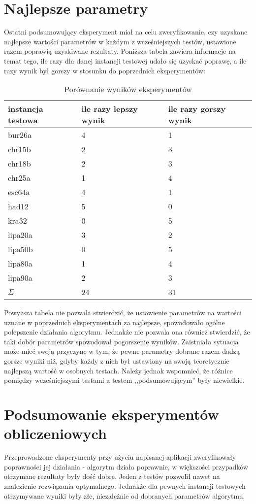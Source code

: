 \section{Najlepsze parametry}
Ostatni podsumowujący eksperyment miał na celu zweryfikowanie, czy uzyskane najlepsze wartości parametrów w każdym z wcześniejszych testów, ustawione razem poprawią uzyskiwane rezultaty. Poniższa tabela zawiera informacje na temat tego, ile razy dla danej instancji testowej udało się uzyskać poprawę, a ile razy wynik był gorszy w stosunku do poprzednich eksperymentów:
\begin{table}[H]
\label{best_porownanie}
\begin{center}
\begin{tabular}{l l l}
\hline
instancja testowa & ile razy lepszy wynik & ile razy gorszy wynik\\
\hline
bur26a & 4 & 1\\
chr15b & 2 & 3\\
chr18b & 2 & 3\\
chr25a & 1 & 4\\
esc64a & 4 & 1\\
had12 & 5 & 0\\
kra32 & 0 & 5\\
lipa20a & 3 & 2\\
lipa50b & 0 & 5\\
lipa80a & 1 & 4\\
lipa90a & 2 & 3\\
\hline
$\Sigma$ & 24 & 31\\
\hline
\end{tabular}
\end{center}
\caption{Porównanie wyników eksperymentów}
\end{table}

Powyższa tabela nie pozwala stwierdzić, że ustawienie parametrów na wartości uznane w poprzednich eksperymentach za najlepsze, spowodowało ogólne polepszenie działania algorytmu. Jednakże nie pozwala ona również stwierdzić, że taki dobór parametrów spowodował pogorszenie wyników. Zaistniała sytuacja może mieć swoją przyczynę w tym, że pewne parametry dobrane razem dadzą gorsze wyniki niż, gdyby każdy z nich był ustawiony na swoją teoretycznie najlepszą wartość w osobnych testach. Należy jednak wspomnieć, że różnice pomiędzy wcześniejszymi testami a testem ,,podsumowującym'' były niewielkie.

\section{Podsumowanie eksperymentów obliczeniowych}
Przeprowadzone eksperymenty przy użyciu napisanej aplikacji zweryfikowały poprawności jej działania - algorytm działa poprawnie, w większości przypadków otrzymane rezultaty były dość dobre. Jeden z testów pozwolił nawet na znalezienie rozwiązania optymalnego. Jednakże dla pewnych instancji testowych otrzymywane wyniki były złe, niezależnie od dobranych parametrów algorytmu. 

